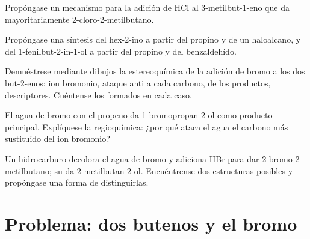 \begin{exercise}[$\star\star$]\label{exo:b1:electrophilic-additions:8}
Propóngase un mecanismo para la adición de HCl al 3-metilbut-1-eno que da
mayoritariamente 2-cloro-2-metilbutano.
\end{exercise}

\begin{exercise}[$\star\star$]\label{exo:b1:electrophilic-additions:9}
Propóngase una síntesis del hex-2-ino a partir del propino y de un
haloalcano, y del 1-fenilbut-2-in-1-ol a partir del propino y del
benzaldehído.
\end{exercise}

\begin{exercise}[$\star\star\star$]\label{exo:b1:electrophilic-additions:10}
Demuéstrese mediante dibujos la estereoquímica de la adición de bromo a
los dos but-2-enos: ion bromonio, ataque anti a cada carbono,
 de los productos, descriptores. Cuéntense los
 formados en cada caso.
\end{exercise}

\begin{exercise}[$\star\star\star$]\label{exo:b1:electrophilic-additions:11}
El agua de bromo con el propeno da 1-bromopropan-2-ol como producto
principal. Explíquese la regioquímica: ¿por qué ataca el agua el carbono
más sustituido del ion bromonio?
\end{exercise}

\begin{exercise}[$\star\star\star$]\label{exo:b1:electrophilic-additions:12}
Un hidrocarburo  decolora el agua de bromo y adiciona HBr para
dar 2-bromo-2-metilbutano; su  da 2-metilbutan-2-ol.
Encuéntrense dos estructuras posibles y propóngase una forma de
distinguirlas.
\end{exercise}

\section{Problema: dos butenos y el bromo}

